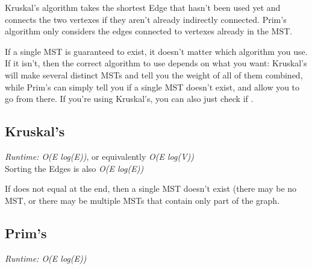 
Kruskal's algorithm takes the shortest Edge that hasn't been used yet and connects the two vertexes if they aren't already indirectly connected. Prim's algorithm only considers the edges connected to vertexes already in the MST.

If a single MST is guaranteed to exist, it doesn't matter which algorithm you use. If it isn't, then the correct algorithm to use depends on what you want: Kruskal's will make several distinct MSTs and tell you the weight of all of them combined, while Prim's can simply tell you if a single MST doesn't exist, and allow you to go from there. If you're using Kruskal's, you can also just check if .

\subsection*{Kruskal's}

\textit{Runtime: O(E log(E))}, or equivalently \textit{O(E log(V))} \\
\indent Sorting the Edges is also \textit{O(E log(E))}

If  does not equal  at the end, then a single MST doesn't exist (there may be no MST, or there may be multiple MSTs that contain only part of the graph.



\subsection*{Prim's}

\textit{Runtime: O(E log(E))}



\newpage